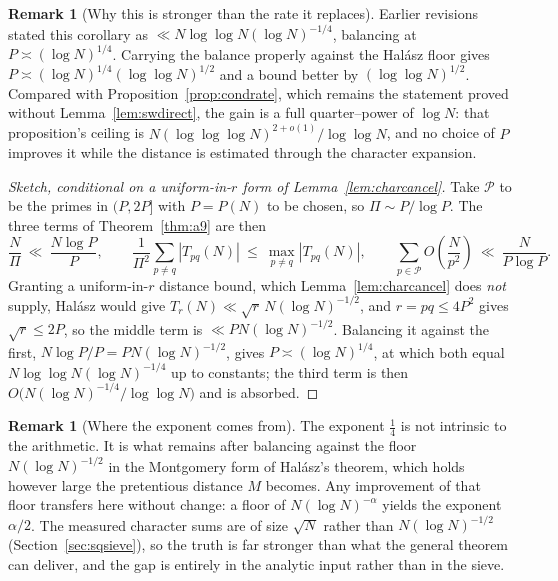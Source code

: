 \documentclass[11pt]{article}
\theoremstyle{definition}
\newtheorem{remark}[theorem]{Remark}
\begin{document}
\begin{remark}[Why this is stronger than the rate it replaces]\label{rem:a9rateimproved}
Earlier revisions stated this corollary as $\ll N\log\log N(\log N)^{-1/4}$, balancing at
$P\asymp(\log N)^{1/4}$. Carrying the balance properly against the Hal\'asz floor gives
$P\asymp(\log N)^{1/4}(\log\log N)^{1/2}$ and a bound better by $(\log\log N)^{1/2}$. Compared with
Proposition~\ref{prop:condrate}, which remains the statement proved without
Lemma~\ref{lem:swdirect}, the gain is a full quarter--power of $\log N$: that proposition's ceiling
is $N(\log\log\log N)^{2+o(1)}/\log\log N$, and no choice of $P$ improves it while the distance is
estimated through the character expansion.
\end{remark}
\begin{proof}[Sketch, conditional on a uniform-in-$r$ form of Lemma~\ref{lem:charcancel}]
Take $\mathcal{P}$ to be the primes in $(P,2P]$ with $P=P(N)$ to be chosen, so
$\Pi\sim P/\log P$. The three terms of Theorem~\ref{thm:a9} are then
\[ \frac{N}{\Pi}\ \ll\ \frac{N\log P}{P},\qquad
   \frac1{\Pi^2}\sum_{p\neq q}|T_{pq}(N)|\ \le\ \max_{p\neq q}|T_{pq}(N)|,\qquad
   \sum_{p\in\mathcal{P}}O\!\left(\frac{N}{p^2}\right)\ \ll\ \frac{N}{P\log P}. \]
Granting a uniform-in-$r$ distance bound, which Lemma~\ref{lem:charcancel} does \emph{not}
supply, Hal\'asz would give
$T_r(N)\ll\sqrt r\,N(\log N)^{-1/2}$, and $r=pq\le4P^2$ gives $\sqrt r\le2P$, so the middle term is
$\ll PN(\log N)^{-1/2}$. Balancing it against the first,
$N\log P/P=PN(\log N)^{-1/2}$, gives $P\asymp(\log N)^{1/4}$, at which both equal
$N\log\log N(\log N)^{-1/4}$ up to constants; the third term is then $O\bigl(N(\log N)^{-1/4}/\log\log N\bigr)$
and is absorbed.
\end{proof}

\begin{remark}[Where the exponent comes from]\label{rem:rateexponent}
The exponent $\tfrac14$ is not intrinsic to the arithmetic. It is what remains after balancing
against the floor $N(\log N)^{-1/2}$ in the Montgomery form of Hal\'asz's theorem, which holds
however large the pretentious distance $M$ becomes. Any improvement of that floor transfers here
without change: a floor of $N(\log N)^{-\alpha}$ yields the exponent $\alpha/2$. The measured
character sums are of size $\sqrt N$ rather than $N(\log N)^{-1/2}$
(Section~\ref{sec:sqsieve}), so the truth is far stronger than what the general theorem can deliver,
and the gap is entirely in the analytic input rather than in the sieve.
\end{remark}
\end{document}
